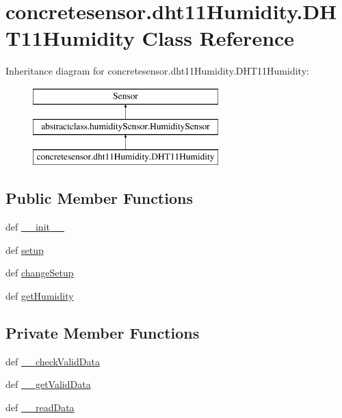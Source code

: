 \hypertarget{classconcretesensor_1_1dht11Humidity_1_1DHT11Humidity}{}\section{concretesensor.\+dht11\+Humidity.\+D\+H\+T11\+Humidity Class Reference}
\label{classconcretesensor_1_1dht11Humidity_1_1DHT11Humidity}
Inheritance diagram for concretesensor.\+dht11\+Humidity.\+D\+H\+T11\+Humidity\+:\begin{figure}[H]
\begin{center}
\leavevmode
\includegraphics[height=3.000000cm]{classconcretesensor_1_1dht11Humidity_1_1DHT11Humidity}
\end{center}
\end{figure}
\subsection*{Public Member Functions}
\begin{DoxyCompactItemize}
\item 
def \hyperlink{classconcretesensor_1_1dht11Humidity_1_1DHT11Humidity_a93e65f26cce04cd997621c1f6bb2e8cd}{\+\_\+\+\_\+init\+\_\+\+\_\+}
\item 
def \hyperlink{classconcretesensor_1_1dht11Humidity_1_1DHT11Humidity_a1f837cf19b9510aa7e05156d49210d97}{setup}
\item 
def \hyperlink{classconcretesensor_1_1dht11Humidity_1_1DHT11Humidity_a893a3a91f5d28248f3b92fead67a60d0}{change\+Setup}
\item 
def \hyperlink{classconcretesensor_1_1dht11Humidity_1_1DHT11Humidity_a9b392707dfc4c5db8fca215511118b58}{get\+Humidity}
\end{DoxyCompactItemize}
\subsection*{Private Member Functions}
\begin{DoxyCompactItemize}
\item 
def \hyperlink{classconcretesensor_1_1dht11Humidity_1_1DHT11Humidity_abd88f5eb29ef6245ed9f1665a574fcf1}{\+\_\+\+\_\+check\+Valid\+Data}
\item 
def \hyperlink{classconcretesensor_1_1dht11Humidity_1_1DHT11Humidity_ad7a825f0f7fd84d2db7b738118487e8e}{\+\_\+\+\_\+get\+Valid\+Data}
\item 
def \hyperlink{classconcretesensor_1_1dht11Humidity_1_1DHT11Humidity_a64f368876d3d529ee6072736191a00f1}{\+\_\+\+\_\+read\+Data}
\end{DoxyCompactItemize}
